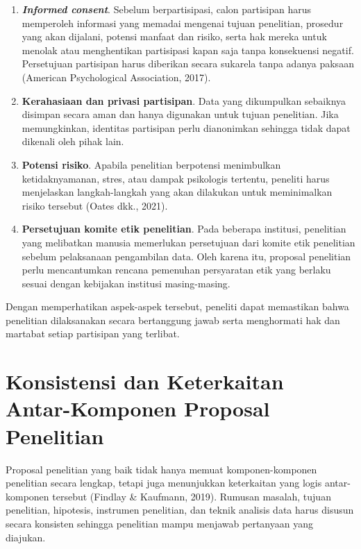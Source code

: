\documentclass[
  indonesian,
  letterpaper,
  DIV=11,
  numbers=noendperiod]{scrreprt}
\begin{document}
\begin{enumerate}
\def\labelenumi{\arabic{enumi}.}
\item
  \textbf{\emph{Informed consent}}. Sebelum berpartisipasi, calon
  partisipan harus memperoleh informasi yang memadai mengenai tujuan
  penelitian, prosedur yang akan dijalani, potensi manfaat dan risiko,
  serta hak mereka untuk menolak atau menghentikan partisipasi kapan
  saja tanpa konsekuensi negatif. Persetujuan partisipan harus diberikan
  secara sukarela tanpa adanya paksaan (American Psychological
  Association, 2017).
\item
  \textbf{Kerahasiaan dan privasi partisipan}. Data yang dikumpulkan
  sebaiknya disimpan secara aman dan hanya digunakan untuk tujuan
  penelitian. Jika memungkinkan, identitas partisipan perlu dianonimkan
  sehingga tidak dapat dikenali oleh pihak lain.
\item
  \textbf{Potensi risiko}. Apabila penelitian berpotensi menimbulkan
  ketidaknyamanan, stres, atau dampak psikologis tertentu, peneliti
  harus menjelaskan langkah-langkah yang akan dilakukan untuk
  meminimalkan risiko tersebut (Oates dkk., 2021).
\item
  \textbf{Persetujuan komite etik penelitian}. Pada beberapa institusi,
  penelitian yang melibatkan manusia memerlukan persetujuan dari komite
  etik penelitian sebelum pelaksanaan pengambilan data. Oleh karena itu,
  proposal penelitian perlu mencantumkan rencana pemenuhan persyaratan
  etik yang berlaku sesuai dengan kebijakan institusi masing-masing.
\end{enumerate}

Dengan memperhatikan aspek-aspek tersebut, peneliti dapat memastikan
bahwa penelitian dilaksanakan secara bertanggung jawab serta menghormati
hak dan martabat setiap partisipan yang terlibat.

\section{Konsistensi dan Keterkaitan Antar-Komponen Proposal
Penelitian}\label{konsistensi-dan-keterkaitan-antar-komponen-proposal-penelitian}

Proposal penelitian yang baik tidak hanya memuat komponen-komponen
penelitian secara lengkap, tetapi juga menunjukkan keterkaitan yang
logis antar-komponen tersebut (Findlay \& Kaufmann, 2019). Rumusan
masalah, tujuan penelitian, hipotesis, instrumen penelitian, dan teknik
analisis data harus disusun secara konsisten sehingga penelitian mampu
menjawab pertanyaan yang diajukan.
\end{document}
